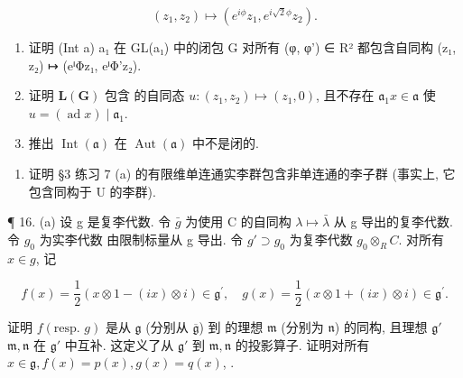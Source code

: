\[
\left(z _ {1}, z _ {2}\right) \mapsto \left(e ^ {i \phi} z _ {1}, e ^ {i \sqrt {2} \phi} z _ {2}\right).
\]

\begin{enumerate}
\def\labelenumi{(\alph{enumi})}
\setcounter{enumi}{1}
\item
  证明 (Int a) \textbar{} a₁ 在 GL(a₁) 中的闭包 G 对所有 (φ, φ') ∈ R² 都包含自同构 (z₁, z₂) ↦ (eⁱΦz₁, eⁱΦ'z₂).
\item
  证明 \(\mathbf{L}(\mathbf{G})\) 包含  的自同态 \(u: (z_1, z_2) \mapsto (z_1, 0)\), 且不存在 \(\mathfrak{a}_1\)\(x \in \mathfrak{a}\) 使 \(u = (\operatorname{ad} x) \mid \mathfrak{a}_1\).
\item
  推出 \(\operatorname{Int}(\mathfrak{a})\) 在 \(\operatorname{Aut}(\mathfrak{a})\) 中不是闭的.
\end{enumerate}

\begin{enumerate}
\def\labelenumi{\arabic{enumi}.}
\setcounter{enumi}{14}
\tightlist
\item
  证明 §3 练习 7 (a) 的有限维单连通实李群包含非单连通的李子群 (事实上, 它包含同构于 U 的李群).
\end{enumerate}

  ¶ 16. (a) 设 g 是复李代数. 令 \(\bar{g}\) 为使用 C 的自同构 \(\lambda \mapsto \bar{\lambda}\) 从 g 导出的复李代数. 令 \(g_0\) 为实李代数
由限制标量从 g 导出. 令 \(g' \supset g_0\) 为复李代数 \(g_0 \otimes_{R} C\). 对所有 \(x \in g\), 记

\[
f (x) = \frac {1}{2} (x \otimes 1 - (i x) \otimes i) \in \mathfrak {g} ^ {\prime}, \quad g (x) = \frac {1}{2} (x \otimes 1 + (i x) \otimes i) \in \mathfrak {g} ^ {\prime}.
\]

证明 \(f(\text{resp. } g)\) 是从 \(\mathfrak{g}\) (分别从 \(\overline{\mathfrak{g}}\)) 到  的理想 \(\mathfrak{m}\) (分别为 \(\mathfrak{n}\)) 的同构, 且理想 \(\mathfrak{g}'\)\(\mathfrak{m}, \mathfrak{n}\) 在 \(\mathfrak{g}'\) 中互补. 这定义了从 \(\mathfrak{g}'\) 到 \(\mathfrak{m}, \mathfrak{n}\) 的投影算子. 证明对所有 \(x \in \mathfrak{g}, f(x) = p(x), g(x) = q(x)\), .

